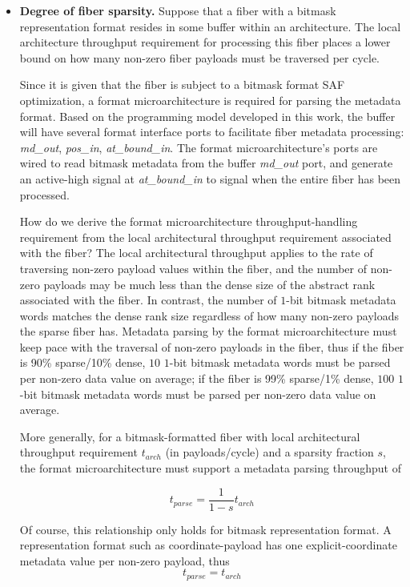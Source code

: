 \begin{itemize}
    \item \textbf{Degree of fiber sparsity.} Suppose that a fiber with a bitmask representation format resides in some buffer within an architecture. The local architecture throughput requirement for processing this fiber places a lower bound on how many non-zero fiber payloads must be traversed per cycle.

    Since it is given that the fiber is subject to a bitmask format SAF optimization, a format microarchitecture is required for parsing the metadata format. Based on the programming model developed in this work, the buffer will have several format interface ports to facilitate fiber metadata processing: \textit{md\_out}, \textit{pos\_in}, \textit{at\_bound\_in}. The format microarchitecture's ports are wired to read bitmask metadata from the buffer \textit{md\_out} port, and generate an active-high signal at \textit{at\_bound\_in} to signal when the entire fiber has been processed.

    How do we derive the format microarchitecture throughput-handling requirement from the local architectural throughput requirement associated with the fiber? The local architectural throughput applies to the rate of traversing non-zero payload values within the fiber, and the number of non-zero payloads may be much less than the dense size of the abstract rank associated with the fiber. In contrast, the number of $1$-bit bitmask metadata words matches the dense rank size regardless of how many non-zero payloads the sparse fiber has. Metadata parsing by the format microarchitecture must keep pace with the traversal of non-zero payloads in the fiber, thus if the fiber is 90\% sparse/10\% dense, $10$ $1$-bit bitmask metadata words must be parsed per non-zero data value on average; if the fiber is 99\% sparse/1\% dense, $100$ $1$-bit bitmask metadata words must be parsed per non-zero data value on average.

    More generally, for a bitmask-formatted fiber with local architectural throughput requirement $t_{arch}$ (in payloads/cycle) and a sparsity fraction $s$, the format microarchitecture must support a metadata parsing throughput of

    \[t_{parse} = \frac{1}{1-s}t_{arch}\]

    Of course, this relationship only holds for bitmask representation format. A representation format such as coordinate-payload has one explicit-coordinate metadata value per non-zero payload, thus \[t_{parse} = t_{arch}\]


\end{itemize}
